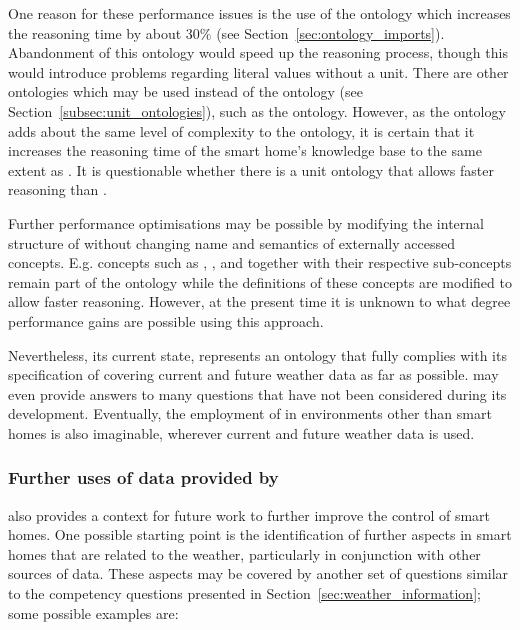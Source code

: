 One reason for these performance issues is the use of the \muo ontology which increases the reasoning time by about $30 \%$ (see Section~\ref{sec:ontology_imports}). Abandonment of this ontology would speed up the reasoning process, though this would introduce problems regarding literal values without a unit. There are other ontologies which may be used instead of the \muo ontology (see Section~\ref{subsec:unit_ontologies}), such as the  ontology. However, as the  ontology adds about the same level of complexity to the ontology, it is certain that it increases the reasoning time of the smart home's knowledge base to the same extent as \muo. It is questionable whether there is a unit ontology that allows faster reasoning than \muo.

Further performance optimisations may be possible by modifying the internal structure of \smarthomeweather without changing name and semantics of externally accessed concepts. E.g. concepts such as , , and  together with their respective sub-concepts remain part of the ontology while the definitions of these concepts are modified to allow faster reasoning. However, at the present time it is unknown to what degree performance gains are possible using this approach.

Nevertheless, its current state, \smarthomeweather represents an ontology that fully complies with its specification of covering current and future weather data as far as possible. \smarthomeweather may even provide answers to many questions that have not been considered during its development. Eventually, the employment of \smarthomeweather in environments other than smart homes is also imaginable, wherever current and future weather data is used.

\subsubsection{Further uses of data provided by \smarthomeweather}

\smarthomeweather also provides a context for future work to further improve the control of smart homes. One possible starting point is the identification of further aspects in smart homes that are related to the weather, particularly in conjunction with other sources of data. These aspects may be covered by another set of questions similar to the competency questions presented in Section~\ref{sec:weather_information}; some possible examples are:

